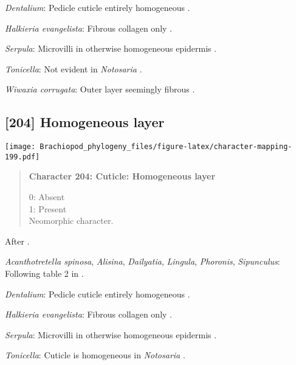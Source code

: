 \documentclass[openany]{book}
\theoremstyle{definition}
\theoremstyle{definition}
\theoremstyle{definition}
\theoremstyle{remark}
\begin{document}
\hypertarget{Dentalium-coding-203}{}
\emph{Dentalium}: Pedicle cuticle entirely homogeneous
\citep{Williams1997Introduction}.

\hypertarget{Halkieria_evangelista-coding-203}{}
\emph{Halkieria evangelista}: Fibrous collagen only
\citep{BereiterHahn1984}.

\hypertarget{Serpula-coding-203}{}
\emph{Serpula}: Microvilli in otherwise homogeneous epidermis
\citep{Williams1997Introduction}.

\hypertarget{Tonicella-coding-203}{}
\emph{Tonicella}: Not evident in \emph{Notosaria}
\citep{BereiterHahn1984, Williams1997Introduction}.

\hypertarget{Wiwaxia_corrugata-coding-203}{}
\emph{Wiwaxia corrugata}: Outer layer seemingly fibrous
\citep{BereiterHahn1984}.

\subsection*{{[}204{]} Homogeneous layer}\label{homogeneous-layer}

\texttt{[image: Brachiopod\_phylogeny\_files/figure-latex/character-mapping-199.pdf]}

\begin{quote}
\textbf{Character 204: Cuticle: Homogeneous layer}

0: Absent\\
1: Present\\
Neomorphic character.
\end{quote}

After \citet{Borisanova2015}.

\hypertarget{Acanthotretella_spinosa-coding-204}{}
\emph{Acanthotretella spinosa}, \emph{Alisina}, \emph{Dailyatia},
\emph{Lingula}, \emph{Phoronis}, \emph{Sipunculus}: Following table 2 in
\citet{Borisanova2015}.

\hypertarget{Dentalium-coding-204}{}
\emph{Dentalium}: Pedicle cuticle entirely homogeneous
\citep{Williams1997Introduction}.

\hypertarget{Halkieria_evangelista-coding-204}{}
\emph{Halkieria evangelista}: Fibrous collagen only
\citep{BereiterHahn1984}.

\hypertarget{Serpula-coding-204}{}
\emph{Serpula}: Microvilli in otherwise homogeneous epidermis
\citep{Williams1997Introduction}.

\hypertarget{Tonicella-coding-204}{}
\emph{Tonicella}: Cuticle is homogeneous in \emph{Notosaria}
\citep{BereiterHahn1984, Williams1997Introduction}.
\end{document}
